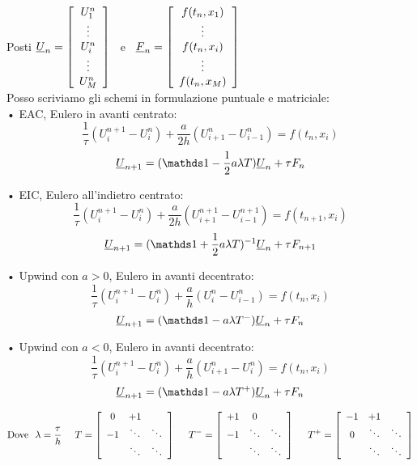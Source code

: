 \documentclass{article}
\renewcommand{\vv}[1]{\underline{#1}}
\begin{document}
Posti $\vv{U}_n=\OO \begin{array}{c} U_1^n \\ \vdots \\ U_i^n \\ \vdots \\ U_{M}^n \end{array} \CC$ \ e \ $\vv{F}_n=\OO \begin{array}{c} f(t_n,x_1) \\ \vdots \\ f(t_n,x_i) \\ \vdots \\ f(t_n,x_M) \end{array} \CC$ \skipp\\
Posso scriviamo gli schemi in formulazione puntuale e matriciale:\skipp\\
• EAC, Eulero in avanti centrato:
\[
\frac{1}{\tau} (U_i^{n+1}- U_i^n) + \frac{a}{2h} (U^{n}_{i+1} - U_{i-1}^{n}) = f(t_{n},x_i)
\]
\[
\vv{U}_{n+1}=(\II - \frac{1}{2}a\lambda T)\vv{U}_n + \tau F_n \skipp
\]

• EIC, Eulero all'indietro centrato:
\[
\frac{1}{\tau} (U_i^{n+1}- U_i^n) + \frac{a}{2h} (U^{n+1}_{i+1} - U_{i-1}^{n+1}) = f(t_{n+1},x_i)
\]
\[
\vv{U}_{n+1}=(\II + \frac{1}{2}a\lambda T)^{-1}\vv{U}_n + \tau F_{n+1} \skipp
\]

• Upwind con $a>0$, Eulero in avanti decentrato:
\[
\frac{1}{\tau}(U_i^{n+1}-U_i^n) + \frac{a}{h}(U_i^n-U_{i-1}^n) = f(t_n,x_i)
\]
\[
\vv{U}_{n+1} = (\II-a\lambda T^-)\vv{U}_n + \tau F_n \skipp
\]

• Upwind con $a<0$, Eulero in avanti decentrato:
\[
\frac{1}{\tau}(U_i^{n+1}-U_i^n) + \frac{a}{h}(U_{i+1}^n-U_i^n) = f(t_n,x_i)
\]
\[
\vv{U}_{n+1} = (\II-a\lambda T^+)\vv{U}_n + \tau F_n \skipp
\]

\[
\text{Dove } \ \lambda=\frac{\tau}{h} \ \ \ \ 
 T=\OO\begin{array}{ccc}
     0 & +1 &  \\
     -1 & \ddots & \ddots \\
     & \ddots & \ddots
\end{array}\CC \ \ \ \ T^-= \OO\begin{array}{ccc}
     +1 & 0 &  \\
     -1 & \ddots & \ddots \\
     & \ddots & \ddots
\end{array}\CC \ \ \ \ T^+ = \OO\begin{array}{ccc}
     -1 & +1 &  \\
     0 & \ddots & \ddots \\
     & \ddots & \ddots
\end{array}\CC
\]
\end{document}
